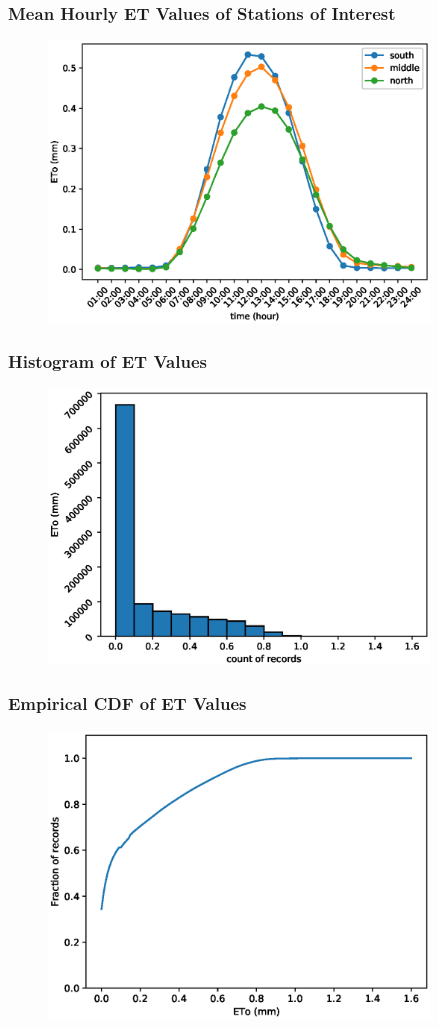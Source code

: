 \begin{frame}
\frametitle{Mean Hourly ET Values of Stations of Interest}
\begin{figure}
\includegraphics[width=0.9\textwidth]{images/soi-latitude-mean-of-hourly-eto-values}
\end{figure}
\end{frame}



\begin{frame}
\frametitle{Histogram of ET Values}
\begin{figure}
\includegraphics[width=0.9\textwidth]{images/hist-eto}
\end{figure}
\end{frame}

\begin{frame}
\frametitle{Empirical CDF of ET Values}
\begin{figure}
\includegraphics[width=0.9\textwidth]{images/ecdf}
\end{figure}
\end{frame}

